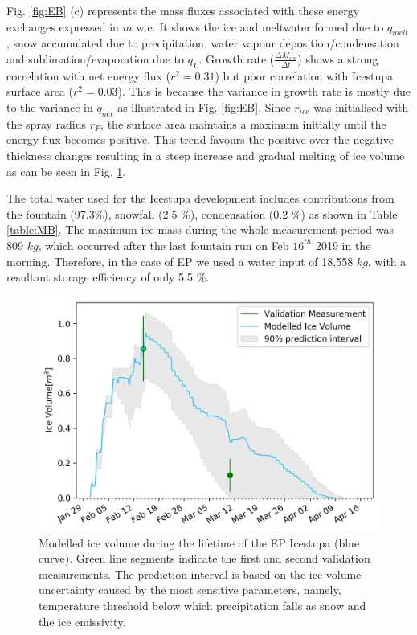 \documentclass[utf8]{frontiersSCNS} %
\begin{document}
Fig. \ref{fig:EB} (c) represents the mass fluxes associated with these energy exchanges expressed in $m$ w.e. It shows
the ice and meltwater formed due to $q_{melt}$, snow accumulated due to precipitation, water vapour
deposition/condensation and sublimation/evaporation due to $q_L$. Growth rate ($\frac{\Delta M_{ice}}{\Delta t}$)
shows a strong correlation with net energy flux ($r^2 = 0.31$) but poor correlation with Icestupa surface area ($r^2 =
0.03$).  This is because the variance in growth rate is mostly due to the variance in $q_{net}$ as illustrated in Fig.
\ref{fig:EB}. Since $r_{ice}$ was initialised with the spray radius $r_F$, the surface area maintains a maximum
initially until the energy flux becomes positive. This trend favours the positive over the negative thickness changes
resulting in a steep increase and gradual melting of ice volume as can be seen in Fig. \ref{fig:results}.

The total water used for the Icestupa development includes contributions from the fountain (97.3\%), snowfall (2.5 \%),
condensation (0.2 \%) as shown in Table \ref{table:MB}. The maximum ice mass during the whole
measurement period was 809 $kg$, which occurred after the last fountain run on Feb $16^{th}$ 2019 in the morning.
Therefore, in the case of EP we used a water input of 18,558 $kg$, with a resultant storage efficiency of only 5.5 \%.

  \begin{figure} \begin{center} \includegraphics[width=15 cm]{Figures/Figure_8.jpg} \end{center} \caption{Modelled ice
  volume during the lifetime of the EP Icestupa (blue curve). Green line segments indicate the first and second
validation measurements. The prediction interval is based on the ice volume uncertainty caused by the most sensitive
parameters, namely, temperature threshold below which precipitation falls as snow and the ice emissivity.}
\label{fig:results} \end{figure}
  
\end{document}
